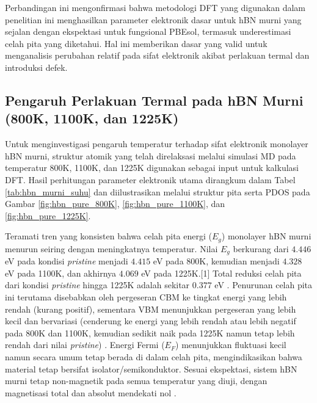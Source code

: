 Perbandingan ini mengonfirmasi bahwa metodologi DFT yang digunakan dalam penelitian ini menghasilkan parameter elektronik dasar untuk hBN murni yang sejalan dengan ekspektasi untuk fungsional PBEsol, termasuk underestimasi celah pita yang diketahui. Hal ini memberikan dasar yang valid untuk menganalisis perubahan relatif pada sifat elektronik akibat perlakuan termal dan introduksi defek.

\subsection{Pengaruh Perlakuan Termal pada hBN Murni (800K, 1100K, dan 1225K)}
\label{subsec:hbn_murni_termal}
Untuk menginvestigasi pengaruh temperatur terhadap sifat elektronik monolayer hBN murni, struktur atomik yang telah direlaksasi melalui simulasi MD pada temperatur 800K, 1100K, dan 1225K digunakan sebagai input untuk kalkulasi DFT. Hasil perhitungan parameter elektronik utama dirangkum dalam Tabel \ref{tab:hbn_murni_suhu} dan diilustrasikan melalui struktur pita serta PDOS pada Gambar \ref{fig:hbn_pure_800K}, \ref{fig:hbn_pure_1100K}, dan \ref{fig:hbn_pure_1225K}.

Teramati tren yang konsisten bahwa celah pita energi ($E_g$) monolayer hBN murni menurun seiring dengan meningkatnya temperatur. Nilai $E_g$ berkurang dari $4.446$ eV pada kondisi \textit{pristine} menjadi $4.415$ eV pada 800K, kemudian menjadi $4.328$ eV pada 1100K, dan akhirnya $4.069$ eV pada 1225K.[1] Total reduksi celah pita dari kondisi \textit{pristine} hingga 1225K adalah sekitar $0.377$ eV \cite{[1]}. Penurunan celah pita ini terutama disebabkan oleh pergeseran CBM ke tingkat energi yang lebih rendah (kurang positif), sementara VBM menunjukkan pergeseran yang lebih kecil dan bervariasi (cenderung ke energi yang lebih rendah atau lebih negatif pada 800K dan 1100K, kemudian sedikit naik pada 1225K namun tetap lebih rendah dari nilai \textit{pristine}) \cite{[1, 1]}. Energi Fermi ($E_F$) menunjukkan fluktuasi kecil namun secara umum tetap berada di dalam celah pita, mengindikasikan bahwa material tetap bersifat isolator/semikonduktor. Sesuai ekspektasi, sistem hBN murni tetap non-magnetik pada semua temperatur yang diuji, dengan magnetisasi total dan absolut mendekati nol \cite{[1, 1, 1]}.

